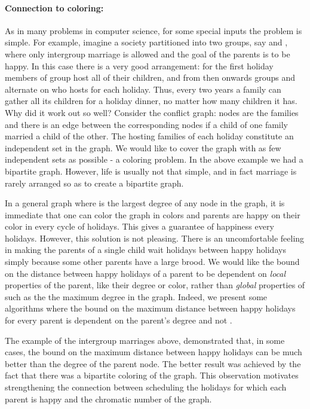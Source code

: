 \documentclass[11pt]{article}
\begin{document}
\paragraph{Connection to coloring:} As in many problems in computer science, for some special inputs the
problem is simple. For example, imagine a society partitioned into two
groups, say  and , where only intergroup marriage is allowed and
the goal of the parents is to be happy. In this case there is a very good
arrangement: for the first holiday members of group  host all of
their children, and from then onwards groups  and  alternate on
who hosts for each holiday. Thus, every two years a family can gather
all its children for a holiday dinner, no matter how many children it
has. Why did it work out so well?
Consider the conflict graph: nodes are the families and there is an
edge between the corresponding nodes if a child of one family married
a child of the other. The hosting families of each holiday constitute
an independent set in the graph. We would like to cover the graph with
as few independent sets as possible - a coloring problem. In the above
example we had a bipartite graph. However, life is usually not that
simple, and in fact marriage is rarely arranged so as to create a
bipartite graph.

In a general graph where  is the largest degree of any node in
the graph, it is immediate that one can color the graph in 
colors and parents are happy on their color in every cycle of
 holidays. This gives a guarantee of happiness every 
holidays. However, this solution is not pleasing. There is an
uncomfortable feeling in making the parents of a single child wait
 holidays between happy holidays simply because some other parents
have a large brood. We would like the bound on the distance
between happy holidays of a parent to be dependent on {\em local} properties of the parent, like their degree or color,
rather than {\em global} properties of  such as the the maximum degree in the graph. Indeed, we present some
algorithms where the bound on the maximum distance between happy holidays
for every parent is dependent on the parent's degree and not .

The example of the intergroup marriages above, demonstrated that, in
some cases, the bound on the maximum distance between happy holidays
can be much better than the degree of the parent node. The better
result was achieved by the fact that there was a bipartite coloring of
the graph. This observation motivates strengthening the connection
between scheduling the holidays for which each parent
is happy and the chromatic number of the graph.
\end{document}
